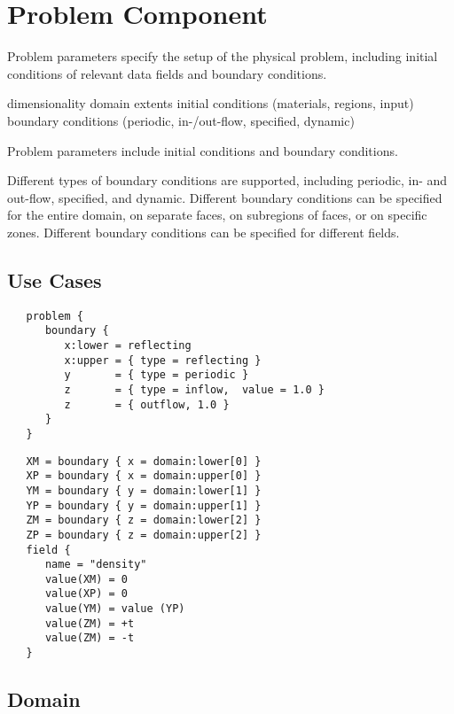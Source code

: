 \section{Problem Component} \label{s:component-problem}

Problem parameters specify the setup of the physical problem,
including initial conditions of relevant data fields and boundary
conditions.

  dimensionality
  domain extents
  initial conditions (materials, regions, input)
 boundary conditions (periodic, in-/out-flow, specified, dynamic)

Problem parameters include initial conditions and boundary conditions.

Different types of boundary conditions are supported, including
periodic, in- and out-flow, specified, and dynamic.  Different
boundary conditions can be specified for the entire domain, on
separate faces, on subregions of faces, or on specific zones.
Different boundary conditions can be specified for different fields.
\subsection{Use Cases}

\begin{verbatim}
   problem {
      boundary {
         x:lower = reflecting
         x:upper = { type = reflecting }
         y       = { type = periodic }
         z       = { type = inflow,  value = 1.0 }
         z       = { outflow, 1.0 }
      }
   }
\end{verbatim}

\begin{verbatim}
   XM = boundary { x = domain:lower[0] }
   XP = boundary { x = domain:upper[0] }
   YM = boundary { y = domain:lower[1] }
   YP = boundary { y = domain:upper[1] }
   ZM = boundary { z = domain:lower[2] }
   ZP = boundary { z = domain:upper[2] }
   field {
      name = "density"
      value(XM) = 0
      value(XP) = 0
      value(YM) = value (YP)
      value(ZM) = +t
      value(ZM) = -t
   }
\end{verbatim}

\subsection{Domain} \label{ss:component-domain}

